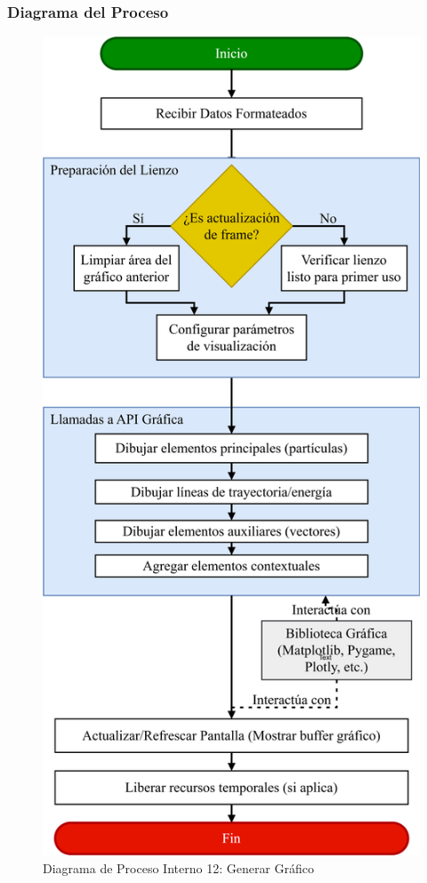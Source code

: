 \subsubsection{Diagrama del Proceso}
\begin{figure}[H]
    \centering
    \includegraphics[width=\textwidth]{img/Analisis/DiagramaProcesos/DiagramaProceso12_GenerarGrafico.png}
    \caption{Diagrama de Proceso Interno 12: Generar Gráfico}%
    \label{fig:process_diagram12}
\end{figure}